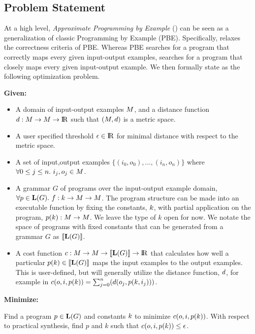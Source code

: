 
\subsection{Problem Statement}
At a high level, \textit{Approximate Programming by Example} (\approximatePBE) can be seen as a generalization of classic Programming by Example (PBE).
Specifically, \approximatePBE relaxes the correctness criteria of PBE.
Whereas PBE searches for a program that correctly maps every given input-output examples, \approximatePBE searches for a program that closely maps every given input-output example.
We then formally state \approximatePBE as the following optimization problem.

\noindent\textbf{Given:}
\begin{itemize}[topsep=0pt]
  \item A domain of input-output examples $M$, and a distance function $d:M \to M \to {\rm I\!R}$ such that $(M,{d})$ is a metric space.
  \item A user specified threshold $\epsilon \in {\rm I\!R}$ for minimal distance with respect to the metric space.
  \item A set of input,output examples $\{(i_0,o_0),...,(i_n,o_n)\}$ where $\forall 0 \leq j \leq n.\ i_j,o_j \in M$.
  \item A grammar $G$ of programs over the input-output example domain, $\forall p \in \mathbf{L}(G).\ f: {k} \to M \to M$. 
    The program structure can be made into an executable function by fixing the constants, ${k}$, with partial application on the program, $p({k}): M \to M$. We leave the type of $k$ open for now. We notate the space of programs with fixed constants that can be generated from a grammar $G$ as $[\![\mathbf{L}(G)]\!]$.
  \item A cost function ${c} : M \to M \to [\![\mathbf{L}(G)]\!] \to {\rm I\!R}$ that calculates how well a particular $p({k}) \in [\![\mathbf{L}(G)]\!]$ maps the input examples to the output examples. This is user-defined, but will generally utilize the distance function, ${d}$, for example in ${c}(o,i,p({k})) = \sum_{j=0}^{n} ({d}(o_j,p({k},i_j)))$.
\end{itemize}
\textbf{Minimize:}

Find a program $p \in \mathbf{L}(G)$ and constants ${k}$ to minimize ${c}(o,i,p({k}))$. 
With respect to practical synthesis, find $p$ and $k$ such that ${c}(o,i,p({k})) \leq \epsilon$.
\vspace{\baselineskip}

